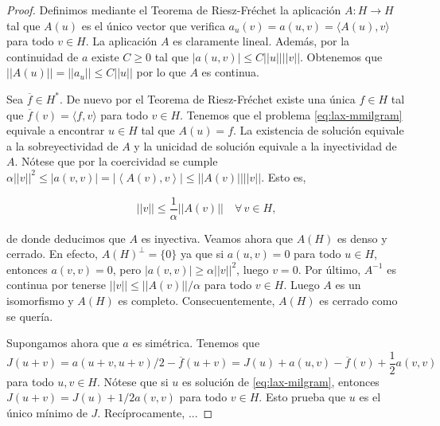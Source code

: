 \documentclass{article}
\begin{document}
\begin{proof}
  Definimos mediante el Teorema de Riesz-Fréchet la aplicación $A \colon H \to H$ tal que $A(u)$ es
  el único vector que verifica $a_u(v) = a(u,v) = \langle A(u), v \rangle$ para todo $v \in H$. La
  aplicación $A$ es claramente lineal. Además, por la continuidad de $a$ existe $C \ge 0$ tal que
  $|a(u,v)| \le C ||u|| ||v ||$. Obtenemos que $||A(u)|| = ||a_u|| \le C ||u||$ por lo que $A$ es
  continua.

  Sea $\overline{f} \in H^*$. De nuevo por el Teorema de Riesz-Fréchet existe una única $f \in H$
  tal que $\overline{f}(v) = \langle f, v\rangle$ para todo $v \in H$. Tenemos que el problema
  \eqref{eq:lax-mmilgram} equivale a encontrar $u\in H$ tal que $A(u) = f$. La existencia de
  solución equivale a la sobreyectividad de $A$ y la unicidad de solución equivale a la inyectividad
  de $A$. Nótese que por la coercividad se cumple
  $\alpha ||v||^2 \le |a(v, v)| = |\left\langle A(v), v \right\rangle| \le ||A(v)||||v||$. Esto es,

  \begin{equation}
    \label{eq:lax-milgram:cota}
    ||v|| \le \frac{1}{\alpha}||A(v)|| \quad \forall\, v \in H,
  \end{equation}
  
  de donde deducimos que $A$ es inyectiva. Veamos ahora que $A(H)$ es denso y cerrado. En efecto,
  $A(H)^\perp = \{0\}$ ya que si $a(u,v) = 0$ para todo $u \in H$, entonces $a(v,v) = 0$, pero
  $|a(v,v)| \ge \alpha ||v||^2$, luego $v = 0$. Por último, $A^{-1}$ es continua por tenerse
  $||v|| \le ||A(v)|| / \alpha$ para todo $v \in H$. Luego $A$ es un isomorfismo y $A(H)$ es
  completo. Consecuentemente, $A(H)$ es cerrado como se quería.

  Supongamos ahora que $a$ es simétrica. Tenemos que
  \[J(u+v) = a(u+v, u+v)/2 - \overline{f}(u+v) = J(u) + a(u,v) - \overline{f}(v) +
    \frac{1}{2}a(v,v)\] para todo $u, v \in H$. Nótese que si $u$ es solución de
  \eqref{eq:lax-milgram}, entonces $J(u+v) = J(u) + 1/2 a(v,v)$ para todo $v \in H$. Esto prueba que
  $u$ es el único mínimo de $J$. Recíprocamente, ...
\end{proof}
\end{document}
